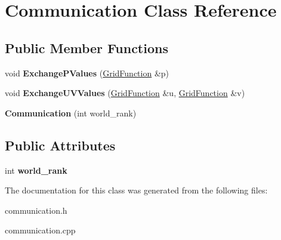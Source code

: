 \hypertarget{classCommunication}{\section{Communication Class Reference}
\label{classCommunication}
}
\subsection*{Public Member Functions}
\begin{DoxyCompactItemize}
\item 
\hypertarget{classCommunication_a4322e5268afce9c5a9df0871fbe8ae7e}{void {\bfseries Exchange\-P\-Values} (\hyperlink{classGridFunction}{Grid\-Function} \&p)}\label{classCommunication_a4322e5268afce9c5a9df0871fbe8ae7e}

\item 
\hypertarget{classCommunication_acf2f656221e1dbbb3bf89ed7b9ab9a9a}{void {\bfseries Exchange\-U\-V\-Values} (\hyperlink{classGridFunction}{Grid\-Function} \&u, \hyperlink{classGridFunction}{Grid\-Function} \&v)}\label{classCommunication_acf2f656221e1dbbb3bf89ed7b9ab9a9a}

\item 
\hypertarget{classCommunication_a074bf45be4cf22c3c2835988ff9e8438}{{\bfseries Communication} (int world\-\_\-rank)}\label{classCommunication_a074bf45be4cf22c3c2835988ff9e8438}

\end{DoxyCompactItemize}
\subsection*{Public Attributes}
\begin{DoxyCompactItemize}
\item 
\hypertarget{classCommunication_a87ec2da39d56bb99125f5fa664cce6db}{int {\bfseries world\-\_\-rank}}\label{classCommunication_a87ec2da39d56bb99125f5fa664cce6db}

\end{DoxyCompactItemize}


The documentation for this class was generated from the following files\-:\begin{DoxyCompactItemize}
\item 
communication.\-h\item 
communication.\-cpp\end{DoxyCompactItemize}
